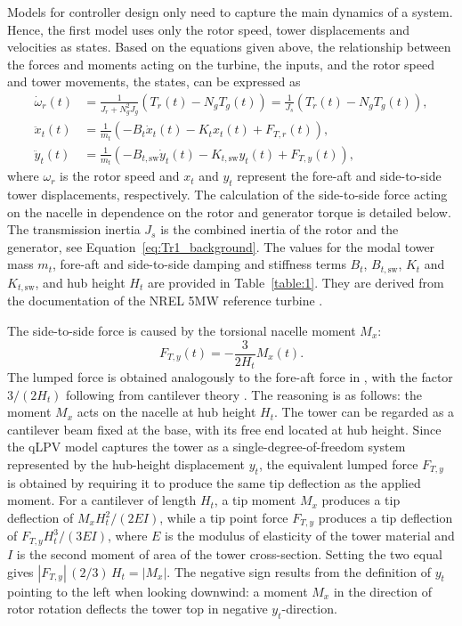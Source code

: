 Models for controller design only need to capture the main dynamics of a system. Hence, the first model uses only the rotor speed, tower displacements and velocities as states. Based on the equations given above, the relationship between the forces and moments acting on the turbine, the inputs, and the rotor speed and tower movements, the states, can be expressed as
\begin{equation}\label{eq:Mdl1NonLin}
    \begin{split} 
        \dot{\omega}_r(t) &= \frac{1}{J_r + N_g^2 J_g}(T_r(t) - N_{g}T_{g}(t)) = \frac{1}{J_s}(T_r(t) - N_{g}T_{g}(t)),   \\
        \ddot{x}_{t}(t) & = \frac{1}{m_{t}}(-B_{t}\dot{x}_{t}(t) - K_{t}{x}_{t}(t) + F_{T,r}(t)), \\
        \ddot{y}_{t}(t) &= \frac{1}{m_{t}}(-B_{t,\text{sw}} \dot{y}_{t}(t) - K_{t,\text{sw}}{y}_{t}(t) + F_{T,y}(t)),       
    \end{split}
\end{equation}
where $\omega_r$ is the rotor speed and $x_t$ and $y_t$ represent the fore-aft and side-to-side tower displacements, respectively. The calculation of the side-to-side force acting on the nacelle in dependence on the rotor and generator torque is detailed below. The transmission inertia $J_s$ is the combined inertia of the rotor and the generator, see Equation~\eqref{eq:Tr1_background}. The values for the modal tower mass $m_{t}$, fore-aft and side-to-side damping and stiffness terms $B_t$, $B_{t,\text{sw}}$, $K_t$ and $K_{t,\text{sw}}$, and hub height $H_t$ are provided in Table~\ref{table:1}. They are derived from the documentation of the NREL 5MW reference turbine \cite{jonkman2009definition}.

The side-to-side force is caused by the torsional nacelle moment $M_x$:
\begin{equation}
    F_{T,y}(t) = -\frac{3}{2H_t}M_x(t).
\end{equation}
The lumped force is obtained analogously to the fore-aft force in \cite{Bianchi2007}, with the factor $3/(2H_t)$ following from cantilever theory \cite{selvam2009feedback}. The reasoning is as follows: the moment $M_x$ acts on the nacelle at hub height $H_t$. The tower can be regarded as a cantilever beam fixed at the base, with its free end located at hub height. Since the qLPV model captures the tower as a single-degree-of-freedom system represented by the hub-height displacement $y_t$, the equivalent lumped force $F_{T,y}$ is obtained by requiring it to produce the same tip deflection as the applied moment. For a cantilever of length $H_t$, a tip moment $M_x$ produces a tip deflection of $M_x H_t^2/(2EI)$, while a tip point force $F_{T,y}$ produces a tip deflection of $F_{T,y} H_t^3/(3EI)$, where $E$ is the modulus of elasticity of the tower material and $I$ is the second moment of area of the tower cross-section. Setting the two equal gives $|F_{T,y}|\,(2/3)\,H_t = |M_x|$. The negative sign results from the definition of $y_t$ pointing to the left when looking downwind: a moment $M_x$ in the direction of rotor rotation deflects the tower top in negative $y_t$-direction.

